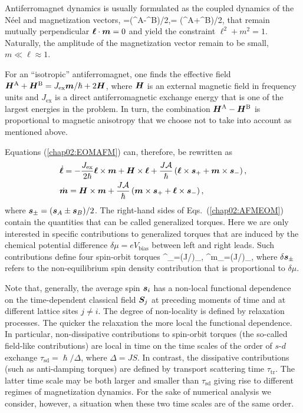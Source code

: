 Antiferromagnet dynamics is usually formulated as the coupled dynamics of the N\'eel and magnetization vectors,
\be
\bb{\ell}=\lt(^\textrm{A}-^\textrm{B}\rt)/2,\qquad {}= \lt(^\textrm{A}+^\textrm{B}\rt)/2,
\e
that remain mutually perpendicular $\boldsymbol{\ell}\cdot \boldsymbol{m}=0$ and yield the constraint $\ell^2+m^2=1$. Naturally, the amplitude of the magnetization vector remain to be small, $m\ll \ell \approx 1$.

For an ``isotropic'' antiferromagnet, one finds the effective field \cite{gomonay_spintronics_2014} $\boldsymbol{H}^\textrm{A}+\boldsymbol{H}^\textrm{B}= J_\textrm{ex}\boldsymbol{m}/\hslash+2\boldsymbol{H}$, where $\boldsymbol{H}$ is an external magnetic field in frequency units and $J_\textrm{ex}$ is a direct antiferromagnetic exchange energy that is one of the largest energies in the problem. In turn, the combination $\boldsymbol{H}^\textrm{A}-\boldsymbol{H}^\textrm{B}$ is proportional to magnetic anisotropy that we choose not to take into account as mentioned above.  

Equations (\ref{chap02:EOMAFM}) can, therefore, be rewritten as
\begin{align}
&\dot{\boldsymbol{\ell}} = -\frac{J_\textrm{ex}}{2\hslash} \boldsymbol{\ell}\times\boldsymbol{m} +\boldsymbol{H}\times\boldsymbol{\ell}+\frac{J\mathcal{A}}{\hslash}\left(\boldsymbol{\ell}\times\boldsymbol{s}_++\boldsymbol{m}\times\boldsymbol{s}_-\right),\nonumber\\
&\dot{\boldsymbol{m}} = \boldsymbol{H}\times\boldsymbol{m}+\frac{J\mathcal{A}}{\hslash}\left(\boldsymbol{m}\times\boldsymbol{s}_++\boldsymbol{\ell}\times\boldsymbol{s}_-\right),
\label{chap02:AFMEOM}
\end{align}
where $\boldsymbol{s}_\pm=(\boldsymbol{s}_A\pm\boldsymbol{s}_B)/2$. The right-hand sides of Eqs.~(\ref{chap02:AFMEOM}) contain the quantities that can be called generalized torques. Here we are only interested in specific contributions to generalized torques that are induced by the chemical potential difference $\delta\mu=eV_\textrm{bias}$ between left and right leads. Such contributions define four spin-orbit torques  
\be
\label{chap02:SOT_def}
^\ell_\pm=(J/\hslash)\bb{\ell}\times\delta{}_\pm, \quad 
{}^m_\pm=(J/\hslash)\times\delta{}_\pm,
\e
where $\delta \boldsymbol{s}_\pm$ refers to the non-equilibrium spin density contribution that is proportional to $\delta\mu$. 

Note that, generally, the average spin $\boldsymbol{s}_i$ has a non-local functional dependence on the time-dependent classical field $\boldsymbol{S}_j$ at preceding moments of time  and at different lattice sites $j\neq i$. The degree of non-locality is defined by relaxation processes. The quicker the relaxation the more local the functional dependence. In particular, non-dissipative contributions to spin-orbit torques (the so-called field-like contributions) are local in time on the time scales of the order of $s$-$d$ exchange  $\tau_\textrm{sd}=\hslash/\Delta$, where $\Delta=J S$. In contrast, the dissipative contributions (such as anti-damping torques) are defined by transport scattering time $\tau_\textrm{tr}$. The latter time scale may be both larger and smaller than $\tau_\textrm{sd}$ giving rise to different regimes of magnetization dynamics. For the sake of numerical analysis we consider, however, a situation when these two time scales are of the same order.

